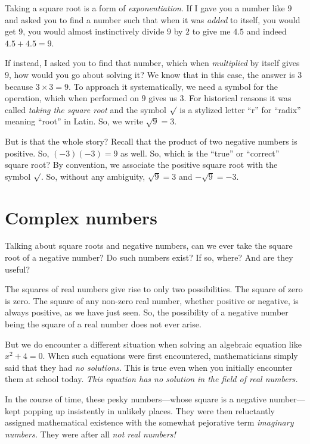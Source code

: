\documentclass[
  a4paper,
]{article}
\begin{document}
Taking a square root is a form of \emph{exponentiation}. If I gave you a
number like \(9\) and asked you to find a number such that when it was
\emph{added} to itself, you would get \(9\), you would almost
instinctively divide \(9\) by \(2\) to give me \(4.5\) and indeed
\(4.5 + 4.5 = 9\).

If instead, I asked you to find that number, which when
\emph{multiplied} by itself gives \(9\), how would you go about solving
it? We know that in this case, the answer is \(3\) because
\(3 \times 3 = 9\). To approach it systematically, we need a symbol for
the operation, which when performed on \(9\) gives us \(3\). For
historical reasons it was called \emph{taking the square root} and the
symbol \(\surd\) is a stylized letter ``r'' for ``radix'' meaning
``root'' in Latin. So, we write \(\sqrt{9} = 3\).

But is that the whole story? Recall that the product of two negative
numbers is positive. So, \((-3)(-3) = 9\) as well. So, which is the
``true'' or ``correct'' square root? By convention, we associate the
positive square root with the symbol \(\surd\). So, without any
ambiguity, \(\sqrt{9} = 3\) and \(-\sqrt{9} = -3\).

\hypertarget{complex-numbers}{%
\section{Complex numbers}\label{complex-numbers}}

Talking about square roots and negative numbers, can we ever take the
square root of a negative number? Do such numbers exist? If so, where?
And are they useful?

The squares of real numbers give rise to only two possibilities. The
square of zero is zero. The square of any non-zero real number, whether
positive or negative, is always positive, as we have just seen. So, the
possibility of a negative number being the square of a real number does
not ever arise.

But we do encounter a different situation when solving an algebraic
equation like \(x^{2} + 4 = 0\). When such equations were first
encountered, mathematicians simply said that they had \emph{no
solutions.} This is true even when you initially encounter them at
school today. \emph{This equation has no solution in the field of real
numbers.}

In the course of time, these pesky numbers---whose square is a negative
number---kept popping up insistently in unlikely places. They were then
reluctantly assigned mathematical existence with the somewhat pejorative
term \emph{imaginary numbers.} They were after all \emph{not real
numbers!}
\end{document}
